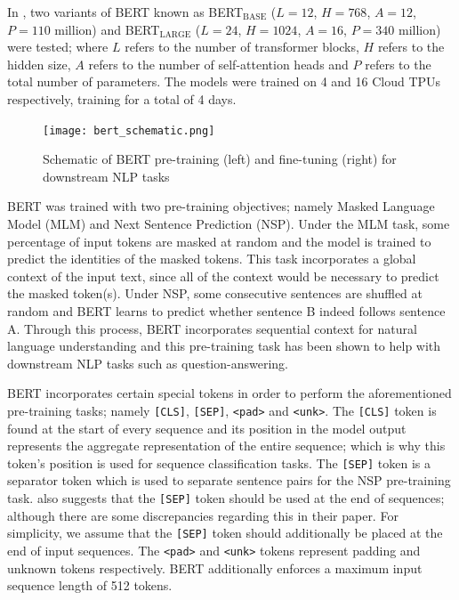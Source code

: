 \begin{description}[style=nextline]
\item [Architecture] In \citet{devlin2018bert}, two variants of BERT known as BERT$_{\text{BASE}}$ ($L=12$, $H=768$, $A=12$, $P=110$ million) and BERT$_{\text{LARGE}}$ ($L=24$, $H=1024$, $A=16$, $P=340$ million) were tested; where $L$ refers to the number of transformer blocks, $H$ refers to the hidden size, $A$ refers to the number of self-attention heads and $P$ refers to the total number of parameters. The models were trained on 4 and 16 Cloud TPUs respectively, training for a total of 4 days.

\begin{figure}[t]
    \centering
    \texttt{[image: bert\_schematic.png]}
    \caption{Schematic of BERT pre-training (left) and fine-tuning (right) for downstream NLP tasks \citep{devlin2018bert}}
    \label{bert_schematic}
\end{figure}

\item [Pre-training Tasks] BERT was trained with two pre-training objectives; namely Masked Language Model (MLM) and Next Sentence Prediction (NSP). Under the MLM task, some percentage of input tokens are masked at random and the model is trained to predict the identities of the masked tokens. This task incorporates a global context of the input text, since all of the context would be necessary to predict the masked token(s). Under NSP, some consecutive sentences are shuffled at random and BERT learns to predict whether sentence B indeed follows sentence A. Through this process, BERT incorporates sequential context for natural language understanding and this pre-training task has been shown to help with downstream NLP tasks such as question-answering.

\item [Special Tokens] BERT incorporates certain special tokens in order to perform the aforementioned pre-training tasks; namely \texttt{[CLS]}, \texttt{[SEP]}, \texttt{<pad>} and \texttt{<unk>}. The \texttt{[CLS]} token is found at the start of every sequence and its position in the model output represents the aggregate representation of the entire sequence; which is why this token's position is used for sequence classification tasks. The \texttt{[SEP]} token is a separator token which is used to separate sentence pairs for the NSP pre-training task. \citet{devlin2018bert} also suggests that the \texttt{[SEP]} token should be used at the end of sequences; although there are some discrepancies regarding this in their paper. For simplicity, we assume that the \texttt{[SEP]} token should additionally be placed at the end of input sequences. The \texttt{<pad>} and \texttt{<unk>} tokens represent padding and unknown tokens respectively. BERT additionally enforces a maximum input sequence length of 512 tokens.


\end{description}

